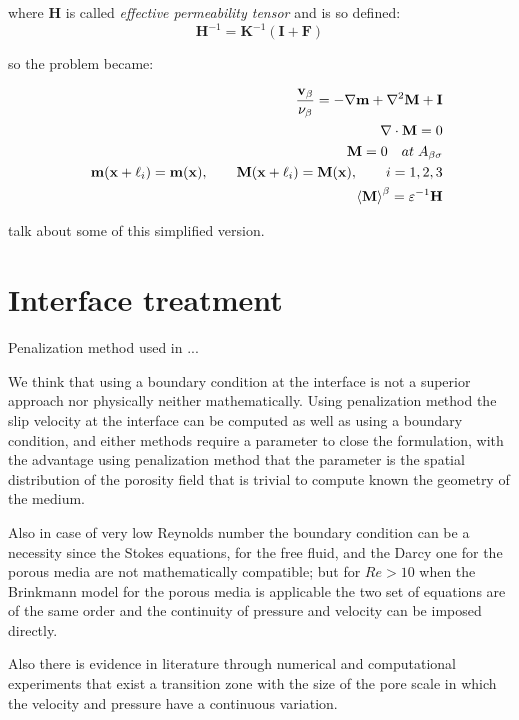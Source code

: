 where $\mathbf{H}$ is called \textit{effective permeability tensor} and is so defined:
$$
\mathbf{H}^{-1} = \mathbf{K}^{-1} \left(\mathbf{I} +\mathbf{F}\right)
$$

so the problem became:

 \begin{eqnarray}
&& \dfrac{\textbf{v}_{\beta}}{\nu_{\beta}} = -\nabla \mathbf{m} + \nabla^2 \mathbf{M} +\mathbf{I}\\
&& \nabla \cdot \mathbf{M} = 0  \\
&&\mathbf{M} = 0 \quad at \; A_{\beta \sigma} \\
&& \mathbf{m}(\mathbf{x} +\ell_i) = \mathbf{m}(\mathbf{x}), \qquad \mathbf{M}(\mathbf{x} +\ell_i) = \mathbf{M}(\mathbf{x}), \qquad i=1,2,3 \\
&& {\left< \mathbf{M} \right>}^{\beta} = \varepsilon^{-1} \mathbf{H}
\label{eq:M_problem}
\end{eqnarray}

\citet{kozeny} talk about some of this simplified version.


\section{Interface treatment}

Penalization method \citet{angot1999penalization} used in\cite{bruneau2004passive} \cite{bruneau2008numerical} \cite{bruneau2010coupling}...


We think that using a boundary condition at the interface is not a superior approach nor physically neither mathematically.
Using penalization method the slip velocity at the interface can be computed as well as using a boundary condition, and either methods require a parameter to close the formulation, with the advantage using penalization method that the parameter is the spatial distribution of the porosity field that is trivial to compute known the geometry of the medium.

Also in case of very low Reynolds number the boundary condition can be a necessity since the Stokes equations, for the free fluid, and the Darcy one for the porous media are not mathematically compatible; but for $Re>10$ when the Brinkmann model for the porous media is applicable the two set of equations are of the same order and the continuity of pressure and velocity can be imposed directly.

Also there is evidence in literature through numerical and computational experiments \citet{ochoa2017fluid} that exist a transition zone with the size of the pore scale in which the velocity and pressure have a continuous variation.
